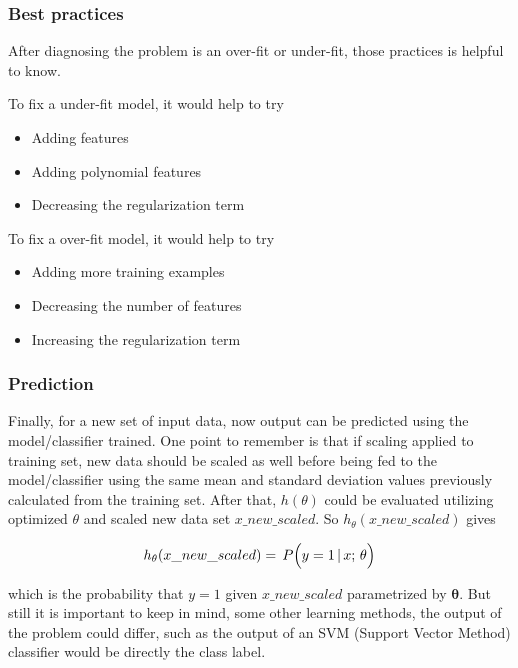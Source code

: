 \subsubsection{Best practices}

After diagnosing the problem is an over-fit or under-fit, those practices is helpful to know. 

To fix a under-fit model, it would help to try 

\begin{itemize}

\item{Adding features}
\item{Adding polynomial features}
\item{Decreasing the regularization term}

\end{itemize}

To fix a over-fit model, it would help to try 

\begin{itemize}

\item{Adding more training examples}
\item{Decreasing the number of features}
\item{Increasing the regularization term}

\end{itemize}

\subsubsection{Prediction}

Finally, for a new set of input data, now output can be predicted using the model/classifier trained. 
One point to remember is that if scaling applied to training set, new data should be scaled as well before being fed to the model/classifier using the same mean and standard deviation values previously calculated from the training set. 
After that, $h(\theta)$ could be evaluated utilizing optimized $\theta$ and scaled new data set $x\_new\_scaled$. 
So $h_\theta(x\_new\_scaled)$ gives

\begin{equation}{\label{eqn:prediction}
h_{\theta}(x\_new\_scaled})
=\,
P\Big(y=1 \, | \, x; \, \theta \Big)
\end{equation} 


which is the probability that $y = 1$ given $x\_new\_scaled$ parametrized by $\bm{\theta}$. 
But still it is important to keep in mind, some other learning methods, the output of the problem could differ, such as the output of an SVM (Support Vector Method) classifier would be directly the class label.


